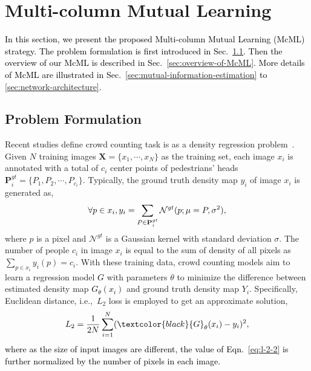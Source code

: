 \documentclass[sigconf]{acmart}
\newcommand{\ljx}[1]{\textcolor{black}{#1}}
\newcommand{\czq}[1]{\textcolor{black}{#1}}
\newcommand{\beq}{\begin{equation}}
\newcommand{\eeq}{\end{equation}}
\newcommand{\NN}{\mathcal{N}}
\newcommand\Eq{Eqn.}
\newcommand\Sec{Sec.}
\begin{document}
\section{Multi-column Mutual Learning}
\label{sec:our-method}
\czq{
In this section, we present the proposed Multi-column Mutual Learning (McML) strategy.
The problem formulation is first introduced in \Sec~\ref{sec:background-and-challenge}.
Then the overview of our McML is described in \Sec~\ref{sec:overview-of-McML}.
More details of McML are illustrated in \Sec~\ref{sec:mutual-information-estimation} to \ref{sec:network-architecture}.}


\subsection{Problem Formulation}
\label{sec:background-and-challenge}
Recent studies define crowd counting task is as a density regression problem~\cite{SANet-18,nips-10,MCNN-16}.
Given $N$ training images $\textbf{X}=\{x_{1}, \cdots, x_{N}\}$ as the training set, each image $x_{i}$ is annotated with a total of $c_{i}$ center points of pedestrians' heads $\textbf{P}_{i}^{gt}=\{P_{1}, P_{2},\cdots, P_{c_{i}}\}$.
Typically, the ground truth density map $y_{i}$ of image $x_{i}$ is generated as, 
\beq
\label{eq:ground-truth-density}
\vspace{-1mm}
\forall p\in x_{i}, y_{i}=\sum_{P\in\textbf{P}_{i}^{gt}}\NN^{gt}(p;\mu=P,\sigma^{2}),
\eeq
where $p$ is a pixel and $\NN^{gt}$ is a Gaussian kernel with standard deviation $\sigma$. 
The number of people $c_{i}$ in image $x_{i}$ is equal to the sum of density of all pixels as $\sum_{p\in x_{i}}y_{ i}(p)=c_{i}$. 
With these training data, crowd counting models aim to learn a regression model \ljx{$G$} with parameters $\theta$ to minimize the difference between estimated density map \ljx{$G_{\theta}(x_i)$} and ground truth density map $Y_i$. 
Specifically, Euclidean distance, i.e.,~$L_2$ loss is employed to get an approximate solution,
\beq
\label{eq:l-2-2}
\vspace{-1mm}
L_2= \frac{1}{2N} \sum^{N}_{i=1} (\ljx{G}_{\theta}(x_i)-y_i)^2,
\eeq
\czq{where as the size of input images are different, the value of \Eq~\ref{eq:l-2-2} is further normalized by the number of pixels in each image.}
\end{document}
